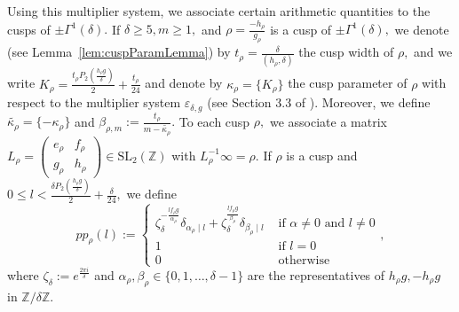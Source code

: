 \documentclass[10pt]{amsart}
\theoremstyle{definition}
\theoremstyle{remark}
\numberwithin{equation}{section}
\newcommand{\SL}{\mathrm{SL}}
\newcommand{\Z}{\mathbb Z}
\begin{document}
	Using this multiplier system, we associate certain arithmetic quantities to the cusps of $\pm\Gamma^1(\delta).$ If $\delta\geq 5, m\geq 1,$ and $\rho=\frac{-h_\rho}{g_\rho}$ is a cusp of $\pm\Gamma^1(\delta),$ we denote (see Lemma~\ref{lem:cuspParamLemma}) by $t_\rho=\frac{\delta}{(h_\rho,\delta)}$ the cusp width of $\rho,$ and we write $K_\rho=\frac{t_\rho P_2\left(\frac{h_\rho g}{\delta}\right)}{2}+\frac{t_\rho}{24}$ and denote by  $\kappa_\rho=\{K_\rho\}$ the cusp parameter of $\rho$ with respect to the multiplier system $\varepsilon_{\delta,g}$ (see Section 3.3 of \cite{RankinBook}). Moreover, we define $\widetilde{\kappa_\rho}=\{-\kappa_\rho\}$ and $\beta_{\rho,m}:=\frac{t_\rho}{m-\widetilde{\kappa_\rho}}.$ To each cusp $\rho,$ we associate a matrix $L_\rho=\begin{pmatrix}
		e_\rho & f_\rho \\
		g_\rho & h_\rho
	\end{pmatrix}\in\SL_2(\Z)$ with $L_\rho^{-1}\infty=\rho.$ If $\rho$ is a cusp and $0\leq l<\frac{\delta P_2\left(\frac{h_\rho g}{\delta}\right)}{2}+\frac{\delta}{24},$ we define
	$$
	pp_\rho(l):=\begin{cases}
		\zeta_{\delta}^{-\frac{lf_\rho g}{\alpha_\rho}}\delta_{\alpha_\rho\mid l}+\zeta_{\delta}^{\frac{lf_\rho g}{\beta_\rho}}\delta_{\beta_\rho\mid l} & \text{ if }\alpha\neq 0\text{ and }l\neq 0 \\
		1 & \text{ if }l = 0 \\
		0 & \text{ otherwise} 
	\end{cases},
	$$
	where $\zeta_\delta:=e^{\frac{2\pi i}{\delta}}$ and $\alpha_\rho,\beta_\rho\in\{0,1,\ldots,\delta-1\}$ are the representatives of $h_\rho g,-h_\rho g$ in $\Z/\delta\Z.$  
	
\end{document}
